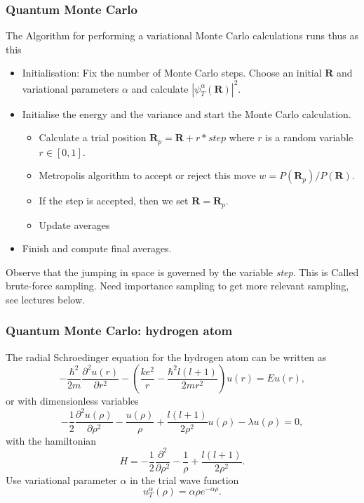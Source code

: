 \documentclass{beamer}
\begin{document}
\begin{frame}
\frametitle{Quantum Monte Carlo}

\begin{block}{}
The Algorithm for performing a variational Monte Carlo calculations runs thus as this

\begin{itemize}
   \item Initialisation: Fix the number of Monte Carlo steps. Choose an initial $\bm{R}$ and variational parameters $\alpha$ and calculate $\left|\psi_T^{\alpha}(\bm{R})\right|^2$. 

   \item Initialise the energy and the variance and start the Monte Carlo calculation.
\begin{itemize}

      \item Calculate  a trial position  $\bm{R}_p=\bm{R}+r*step$ where $r$ is a random variable $r \in [0,1]$.

      \item Metropolis algorithm to accept or reject this move  $w = P(\bm{R}_p)/P(\bm{R})$.

      \item If the step is accepted, then we set $\bm{R}=\bm{R}_p$. 

      \item Update averages

\end{itemize}

\noindent
   \item Finish and compute final averages.
\end{itemize}

\noindent
Observe that the jumping in space is governed by the variable \emph{step}. This is Called brute-force sampling.
Need importance sampling to get more relevant sampling, see lectures below.
\end{block}
\end{frame}

\begin{frame}
\frametitle{Quantum Monte Carlo: hydrogen atom}

\begin{block}{}
The radial Schroedinger equation for the hydrogen atom can be
written as
\[
-\frac{\hbar^2}{2m}\frac{\partial^2 u(r)}{\partial r^2}-
\left(\frac{ke^2}{r}-\frac{\hbar^2l(l+1)}{2mr^2}\right)u(r)=Eu(r),
\]
or with dimensionless variables
\[
-\frac{1}{2}\frac{\partial^2 u(\rho)}{\partial \rho^2}-
\frac{u(\rho)}{\rho}+\frac{l(l+1)}{2\rho^2}u(\rho)-\lambda u(\rho)=0,
\label{eq:hydrodimless1}
\]
with the hamiltonian
\[
H=-\frac{1}{2}\frac{\partial^2 }{\partial \rho^2}-
\frac{1}{\rho}+\frac{l(l+1)}{2\rho^2}.
\]
Use variational parameter $\alpha$ in the trial
wave function 
\[
   u_T^{\alpha}(\rho)=\alpha\rho e^{-\alpha\rho}. 
   \label{eq:trialhydrogen}
\]
\end{block}
\end{frame}
\end{document}
